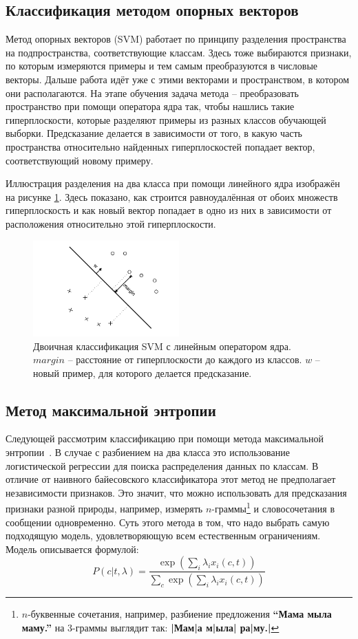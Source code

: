 \subsection{Классификация методом опорных векторов}
Метод опорных векторов (SVM)\cite{tong2002support} работает по принципу разделения пространства на
подпространства, соответствующие классам. Здесь тоже выбираются признаки, по которым измеряются
примеры и тем самым преобразуются в числовые векторы. Дальше работа идёт уже с этими векторами и
пространством, в котором они располагаются. На этапе обучения задача метода -- преобразовать
пространство при помощи оператора ядра так, чтобы нашлись такие гиперплоскости,
которые разделяют примеры из разных классов обучающей выборки. Предсказание делается в зависимости
от того, в какую часть пространства относительно найденных гиперплоскостей попадает вектор,
соответствующий новому примеру.

Иллюстрация разделения на два класса при помощи линейного ядра изображён на рисунке
\ref{linear_svm}. Здесь показано, как строится равноудалённая от обоих множеств гиперплоскость и как
новый вектор попадает в одно из них в зависимости от расположения относительно этой гиперплоскости.

\begin{figure}
  \centering
  \includegraphics[width=0.5\textwidth]{linear_svm}
  \caption{Двоичная классификация SVM с линейным оператором ядра. $margin$ -- расстояние от
    гиперплоскости до каждого из классов. $w$ -- новый пример, для которого делается предсказание.}\label{linear_svm}
\end{figure}

\subsection{Метод максимальной энтропии}
Следующей рассмотрим классификацию при помощи метода максимальной энтропии~\cite{nigam1999using}. В
случае с разбиением на два класса это использование логистической регрессии для поиска распределения
данных по классам. В отличие от наивного байесовского классификатора этот метод не
предполагает независимости признаков. Это значит, что можно использовать для предсказания признаки
разной природы, например, измерять $n$-граммы\footnote{$n$-буквенные сочетания, например, разбиение
  предложения \textbf{``Мама мыла маму.''} на 3-граммы выглядит так: \textbf{|Мам|а м|ыла| ра|му.|}} и словосочетания в сообщении одновременно.
Суть этого метода в том, что надо выбрать самую
подходящую модель, удовлетворяющую всем естественным ограничениям. Модель описывается формулой:
$$P(c|t,\lambda) = \frac{\exp(\sum_i\lambda_ix_i(c,t))}
{\sum_{c}\exp(\sum_i\lambda_ix_i(c,t))}$$

